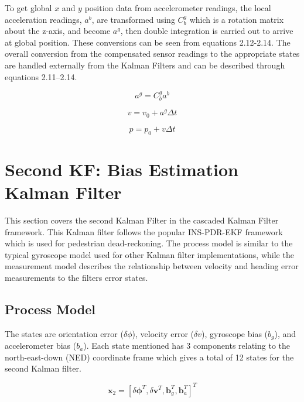 To get global $x$ and $y$ position data from 
accelerometer readings, the local acceleration readings, $a^b$, are transformed using 
$C^g_b$ which is a rotation matrix about the z-axis, and become $a^g$, then double 
integration is carried out to arrive at global position. These conversions can be 
seen from equations 2.12-2.14. The overall conversion from the 
compensated sensor readings to the appropriate states are handled externally from 
the Kalman Filters and can be described through equations 2.11--2.14.

\begin{equation}
  a^g = C^g_b a^b
\end{equation}

\begin{equation}
  v = v_0 + a^g \Delta t
\end{equation}

\begin{equation}
  p = p_0 + v \Delta t
\end{equation}


\section{Second KF: Bias Estimation Kalman Filter}

This section covers the second Kalman Filter in the cascaded Kalman Filter 
framework. This Kalman filter follows the popular INS-PDR-EKF framework which is 
used for pedestrian dead-reckoning. The process model is similar to the typical 
gyroscope model used for other Kalman filter implementations, while the measurement 
model describes the relationship between velocity and heading error measurements to 
the filters error states.

\subsection{Process Model}

The states are orientation error ($\delta\phi$), velocity error ($\delta v$), 
gyroscope bias ($b_g$), and accelerometer bias ($b_a$). Each state mentioned has 3 
components relating to the north-east-down (NED) coordinate frame which gives a 
total of 12 states for the second Kalman filter.

\begin{equation}
  \boldsymbol{x}_2 = [\delta\boldsymbol{\phi}^T, \delta\boldsymbol{v}^T,
       \boldsymbol{b}^T_g, \boldsymbol{b}^T_a]^T
\end{equation}

